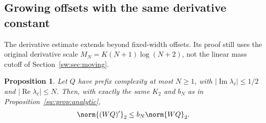 \documentclass[11pt,a4paper]{article}
\numberwithin{equation}{section}
\newtheorem{proposition}[theorem]{Proposition}
\theoremstyle{definition}\newtheorem{definition}[theorem]{Definition}
\theoremstyle{remark}\newtheorem{remark}[theorem]{Remark}
\DeclareMathOperator{\Rea}{Re}\DeclareMathOperator{\Ima}{Im}
\begin{document}
\subsection{Growing offsets with the same derivative constant}\label{sw:sec:wide-derivative}
The derivative estimate extends beyond fixed-width offsets. Its proof still uses the original derivative scale $M_N=K(N+1)\log(N+2)$, not the linear mass cutoff of Section~\ref{sw:sec:moving}.

\begin{proposition}\label{sw:prop:wide-derivative}
Let $Q$ have prefix complexity at most $N\ge1$, with
$|\Ima\lambda_\ell|\le1/2$ and $|\Rea\lambda_\ell|\le N$. Then, with exactly the same $K_2$ and $b_N$ as in Proposition~\ref{sw:prop:analytic},
\begin{equation}\label{sw:eq:wide-derivative}
 \norm{(WQ)'}_2\le b_N\norm{WQ}_2.
\end{equation}
\end{proposition}
\end{document}
